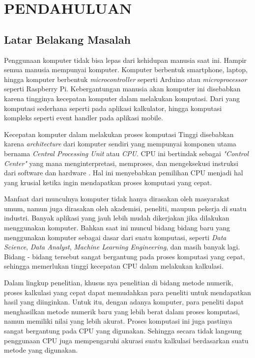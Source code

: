 \chapter{PENDAHULUAN}
\setcounter{page}{1}
\section{Latar Belakang Masalah}
\label{latarbelakang}


Penggunaan komputer tidak bisa lepas dari kehidupan manusia saat ini. Hampir
semua manusia mempunyai komputer. Komputer berbentuk smartphone, laptop, hingga
komputer berbentuk \emph{microcontroller} seperti Arduino atau
\emph{microprocessor} seperti Raspberry Pi. Kebergantungan manusia akan
komputer ini disebabkan karena tingginya kecepatan komputer dalam melakukan
komputasi. Dari yang komputasi sederhana seperti pada aplikasi kalkulator,
hingga komputasi kompleks seperti event handler pada aplikasi mobile.


Kecepatan komputer dalam melakukan proses komputasi Tinggi disebabkan karena
\emph{architecture} dari komputer sendiri yang mempunyai komponen utama bernama
\emph{Central Processing Unit} atau \emph{CPU}. CPU ini bertindak sebagai
\emph{"Control Center"} yang mana menginterpretasi, memproses, dan mengeksekusi
instruksi dari software dan hardware \citep{armWhatCentralProcessing2023}. Hal
ini menyebabkan pemilihan CPU menjadi hal yang krusial ketika ingin mendapatkan
proses komputasi yang cepat.


Manfaat dari munculnya komputer tidak hanya dirasakan oleh masyarakat umum,
namun juga dirasakan oleh akademisi, peneliti, maupun pekerja di suatu
industri. Banyak aplikasi yang jauh lebih mudah dikerjakan jika dilakukan
menggunakan komputer. Bahkan saat ini muncul bidang bidang baru yang
menggunakan komputer sebagai dasar dari suatu komputasi, seperti \emph{Data Science},
\emph{Data Analyst}, \emph{Machine Learning Engineering}, dan masih
banyak lagi. Bidang - bidang tersebut sangat bergantung pada proses komputasi
yang cepat, sehingga memerlukan tinggi kecepatan CPU dalam melakukan kalkulasi.

Dalam lingkup penelitian, khusus nya penelitian di bidang metode numerik,
proses kalkulasi yang cepat dapat memudahkan para peneliti untuk mendapatkan
hasil yang diinginkan. Untuk itu, dengan adanya komputer, para peneliti dapat
menghasilkan metode numerik baru yang lebih berat dalam proses komputasi, namun
memiliki nilai yang lebih akurat. Proses komputasi ini juga pastinya sangat
bergantung pada CPU yang digunakan. Sehingga secara tidak langsung penggunaan
CPU juga mempengaruhi akurasi suatu kalkulasi berdasarkan suatu metode yang
digunakan.

